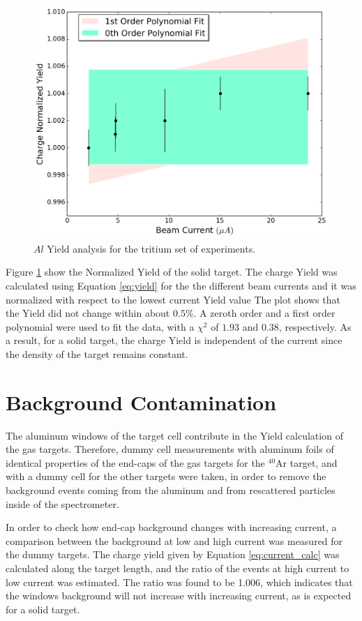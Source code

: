 \documentclass[final,5p,times,twocolumn,balance]{elsarticle}
\begin{document}
\begin{figure}[htbp]
    \centering
    \includegraphics[width=\linewidth]{images/solid_target.pdf}
    \caption{$Al$ Yield analysis for the tritium set of experiments.}
    \label{fig:solid}
\end{figure}

Figure \ref{fig:solid} show the Normalized Yield of the solid target. The charge Yield was calculated using Equation \ref{eq:yield} for the the different beam currents and it was normalized with respect to the lowest current Yield value The plot shows that the Yield did not change within about $0.5 \%$. A zeroth order and a first order polynomial were used to fit the data, with a $\chi ^{2}$ of $1.93$ and $0.38$, respectively. As a result, for a solid target, the charge Yield is independent of the current since the density of the target remains constant.

\section{Background Contamination}

The aluminum windows of the target cell contribute in the Yield calculation of the gas targets. Therefore, dummy cell measurements with aluminum foils of identical properties of the end-caps of the gas targets for the $^{40}$Ar target, and with a dummy cell for the other targets were taken, in order to remove the background events coming from the aluminum and from rescattered particles inside of the spectrometer. 

In order to check how end-cap background changes with increasing current, a comparison between the background at low and high current was measured for the dummy targets. The charge yield given by Equation \ref{eq:current_calc} was calculated along the target length, and the ratio of the events at high current to low current was estimated. The ratio was found to be 1.006, which indicates that the windows background will not increase with increasing current, as is expected for a solid target. 
\end{document}
